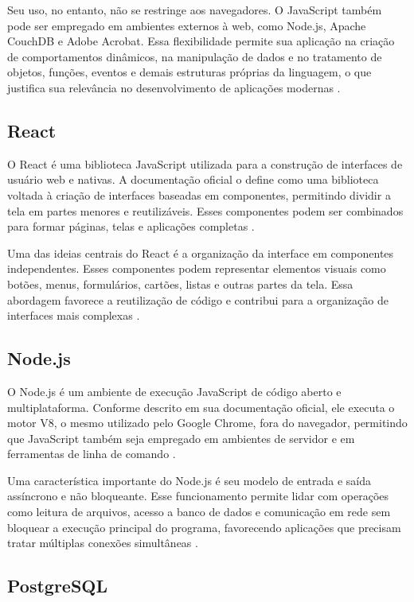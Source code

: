 Seu uso, no entanto, não se restringe aos navegadores. O JavaScript também pode ser empregado em ambientes externos à web, como Node.js, Apache CouchDB e Adobe Acrobat. Essa flexibilidade permite sua aplicação na criação de comportamentos dinâmicos, na manipulação de dados e no tratamento de objetos, funções, eventos e demais estruturas próprias da linguagem, o que justifica sua relevância no desenvolvimento de aplicações modernas \cite{mdn_javascript_2026}.

\subsection{React}

O React é uma biblioteca JavaScript utilizada para a construção de interfaces de usuário web e nativas. A documentação oficial o define como uma biblioteca voltada à criação de interfaces baseadas em componentes, permitindo dividir a tela em partes menores e reutilizáveis. Esses componentes podem ser combinados para formar páginas, telas e aplicações completas \cite{react_docs_2026}.

Uma das ideias centrais do React é a organização da interface em componentes independentes. Esses componentes podem representar elementos visuais como botões, menus, formulários, cartões, listas e outras partes da tela. Essa abordagem favorece a reutilização de código e contribui para a organização de interfaces mais complexas \cite{react_docs_2026}.

\subsection{Node.js}

O Node.js é um ambiente de execução JavaScript de código aberto e multiplataforma. Conforme descrito em sua documentação oficial, ele executa o motor V8, o mesmo utilizado pelo Google Chrome, fora do navegador, permitindo que JavaScript também seja empregado em ambientes de servidor e em ferramentas de linha de comando \cite{nodejs_intro_2026}.

Uma característica importante do Node.js é seu modelo de entrada e saída assíncrono e não bloqueante. Esse funcionamento permite lidar com operações como leitura de arquivos, acesso a banco de dados e comunicação em rede sem bloquear a execução principal do programa, favorecendo aplicações que precisam tratar múltiplas conexões simultâneas \cite{nodejs_intro_2026}.

\subsection{PostgreSQL}

